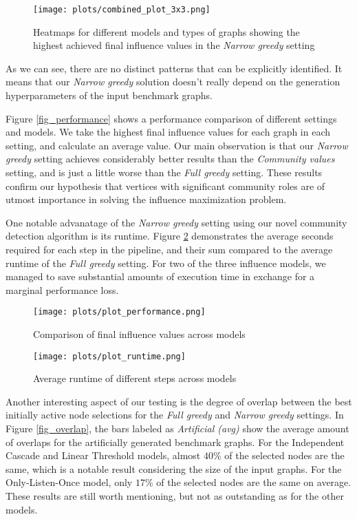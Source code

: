 \documentclass[pdflatex,sn-mathphys-ay]{sn-jnl}
\begin{document}
\begin{figure}[ht]
\centering
\texttt{[image: plots/combined\_plot\_3x3.png]}
\caption{Heatmaps for different models and types of graphs showing the highest achieved final influence values in the \textit{Narrow greedy} setting}
\label{fig_performance_models_parameters}
\end{figure}

As we can see, there are no distinct patterns that can be explicitly identified. It means that our \textit{Narrow greedy} solution doesn't really depend on the generation hyperparameters of the input benchmark graphs.

Figure \ref{fig_performance} shows a performance comparison of different settings and models. We take the highest final influence values for each graph in each setting, and calculate an average value. Our main observation is that our \textit{Narrow greedy} setting achieves considerably better results than the \textit{Community values} setting, and is just a little worse than the \textit{Full greedy} setting. These results confirm our hypothesis that vertices with significant community roles are of utmost importance in solving the influence maximization problem.

One notable advanatage of the \textit{Narrow greedy} setting using our novel community detection algorithm is its runtime. Figure \ref{fig_runtimes} demonstrates the average seconds required for each step in the pipeline, and their sum compared to the average runtime of the \textit{Full greedy} setting. For two of the three influence models, we managed to save substantial amounts of execution time in exchange for a marginal performance loss.

\begin{figure}[ht]
\centering
\begin{minipage}[b]{0.45\textwidth}
\texttt{[image: plots/plot\_performance.png]}
\caption{Comparison of final influence values across models}
\label{fig_performance}
\end{minipage}
\hfill
\begin{minipage}[b]{0.45\textwidth}
\texttt{[image: plots/plot\_runtime.png]}
\caption{Average runtime of different steps across models}
\label{fig_runtimes}
\end{minipage}
\end{figure}

Another interesting aspect of our testing is the degree of overlap between the best initially active node selections for the \textit{Full greedy} and \textit{Narrow greedy} settings. In Figure \ref{fig_overlap}, the bars labeled as \textit{Artificial (avg)} show the average amount of overlaps for the artificially generated benchmark graphs. For the Independent Cascade and Linear Threshold models, almost $40\%$ of the selected nodes are the same, which is a notable result considering the size of the input graphs. For the Only-Listen-Once model, only $17\%$ of the selected nodes are the same on average. These results are still worth mentioning, but not as outstanding as for the other models.
\end{document}
